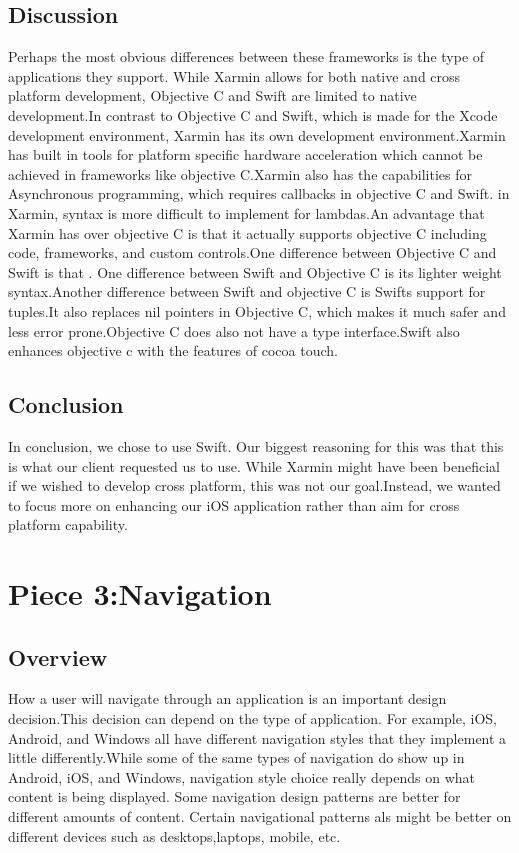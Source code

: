 \documentclass[onecolumn, draftclsnofoot,10pt, compsoc]{IEEEtran}
\begin{document}
    \subsection{Discussion}
    Perhaps the most obvious differences between these frameworks is the type of applications they support. While Xarmin  allows for both native and cross platform development, Objective C and Swift are limited to native development.In contrast to Objective C and Swift, which is made for the Xcode development environment, Xarmin has its own development environment.Xarmin has built in tools for platform specific hardware acceleration which cannot be achieved in frameworks like objective C.Xarmin also has the capabilities for Asynchronous programming, which requires callbacks in objective C and Swift. in Xarmin, syntax is more difficult to implement for lambdas.An advantage that Xarmin has over objective C is that it actually supports objective C including code, frameworks, and custom controls.One difference between Objective C and Swift is that . One difference between Swift and Objective C is its lighter weight syntax.Another difference between Swift and objective C is Swifts support for tuples.It also replaces nil pointers in Objective C, which makes it much safer and less error prone.Objective C does also not have a type interface.Swift also enhances objective c with the features of cocoa touch.
\subsection{Conclusion}    
 In conclusion, we chose to use Swift. Our biggest reasoning for this was that this is what our client requested us to use. While Xarmin might have been beneficial if we wished to develop cross platform, this was not our goal.Instead, we wanted to focus more on enhancing our iOS application rather than aim for cross platform capability. 
 \section{Piece 3:Navigation}  
 \subsection{Overview}
   How a user will navigate through an application is an important design decision.This decision can depend on the type of application. For example, iOS, Android, and Windows all have different navigation styles that they implement a little differently.While some of the same types of navigation do show up in Android, iOS, and Windows, navigation style choice really depends on what content is being displayed. Some navigation design patterns are better for different amounts of content. Certain navigational patterns als might be better on different devices such as desktops,laptops, mobile, etc.
\end{document}
